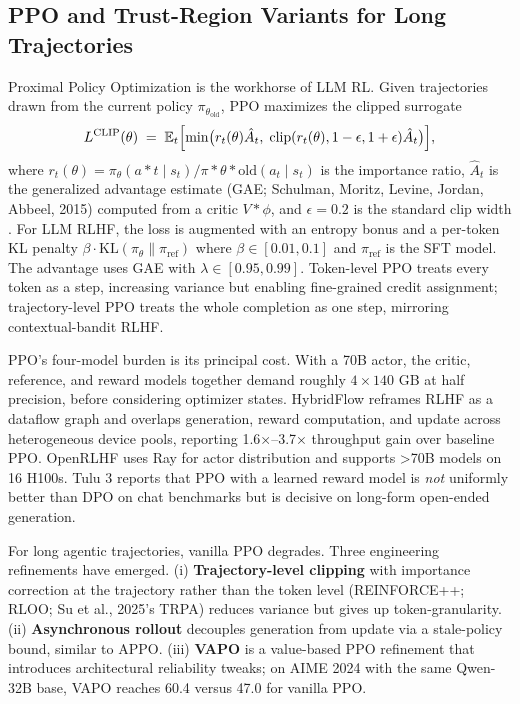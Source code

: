 \documentclass{article}
\begin{document}
\subsection{PPO and Trust-Region Variants for Long Trajectories}\label{ppo-and-trust-region-variants-for-long-trajectories}

Proximal Policy Optimization is the workhorse of LLM RL. Given trajectories drawn from the current policy \(\pi_{\theta_{\mathrm{old}}}\), PPO maximizes the clipped surrogate
\[L^{\mathrm{CLIP}}(\theta) \;=\; \mathbb{E}_t\Bigl[ \min\bigl(r_t(\theta) \hat A_t,\; \mathrm{clip}(r_t(\theta), 1-\epsilon, 1+\epsilon) \hat A_t\bigr) \Bigr],\]
where \(r_t(\theta) = \pi_\theta(a*t\mid s_t)/\pi*{\theta*{\mathrm{old}}}(a_t\mid s_t)\) is the importance ratio, \(\hat A_t\) is the generalized advantage estimate (GAE; Schulman, Moritz, Levine, Jordan, Abbeel, 2015) computed from a critic \(V*\phi\), and \(\epsilon = 0.2\) is the standard clip width \citep{schulman2017proximalpolicyopti}. For LLM RLHF, the loss is augmented with an entropy bonus and a per-token KL penalty \(\beta \cdot \mathrm{KL}(\pi_\theta \| \pi_{\mathrm{ref}})\) where \(\beta \in [0.01, 0.1]\) and \(\pi_{\mathrm{ref}}\) is the SFT model. The advantage uses GAE with \(\lambda \in [0.95, 0.99]\). Token-level PPO \citep{zhong20242024} treats every token as a step, increasing variance but enabling fine-grained credit assignment; trajectory-level PPO treats the whole completion as one step, mirroring contextual-bandit RLHF.

PPO's four-model burden is its principal cost. With a 70B actor, the critic, reference, and reward models together demand roughly \(4 \times 140\) GB at half precision, before considering optimizer states. HybridFlow \citep{sheng20242024} reframes RLHF as a dataflow graph and overlaps generation, reward computation, and update across heterogeneous device pools, reporting 1.6×--3.7× throughput gain over baseline PPO. OpenRLHF \citep{hu20252025} uses Ray for actor distribution and supports \textgreater70B models on 16 H100s. Tulu 3 \citep{lambert20242024} reports that PPO with a learned reward model is \emph{not} uniformly better than DPO on chat benchmarks but is decisive on long-form open-ended generation.

For long agentic trajectories, vanilla PPO degrades. Three engineering refinements have emerged. (i) \textbf{Trajectory-level clipping} with importance correction at the trajectory rather than the token level (REINFORCE++; RLOO; Su et al., 2025's TRPA) reduces variance but gives up token-granularity. (ii) \textbf{Asynchronous rollout} decouples generation from update via a stale-policy bound, similar to APPO. (iii) \textbf{VAPO} \citep{yu20252025} is a value-based PPO refinement that introduces architectural reliability tweaks; on AIME 2024 with the same Qwen-32B base, VAPO reaches 60.4 versus 47.0 for vanilla PPO.
\end{document}

